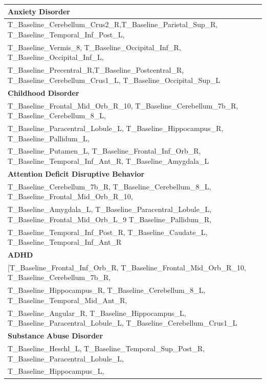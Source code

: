\documentclass[9pt]{article}
\begin{document}
\begin{table}[h!]
	\centering
	\begin{small}
	\begin{tabular}{|l|} 
		\hline
\textbf{ Anxiety Disorder }\\\hline
T\_Baseline\_Cerebellum\_Crus2\_R,T\_Baseline\_Parietal\_Sup\_R, T\_Baseline\_Temporal\_Inf\_Post\_L,\\ T\_Baseline\_Vermis\_8, T\_Baseline\_Occipital\_Inf\_R, T\_Baseline\_Occipital\_Inf\_L,    \\ 
T\_Baseline\_Precentral\_R,T\_Baseline\_Postcentral\_R, T\_Baseline\_Cerebellum\_Crus1\_L, T\_Baseline\_Occipital\_Sup\_L \\ \hline   
 \textbf{Childhood Disorder} \\ \hline
  T\_Baseline\_Frontal\_Mid\_Orb\_R\_10, T\_Baseline\_Cerebellum\_7b\_R,
 T\_Baseline\_Cerebellum\_8\_L,   \\ T\_Baseline\_Paracentral\_Lobule\_L,
  T\_Baseline\_Hippocampus\_R,      T\_Baseline\_Pallidum\_L,      \\    
 T\_Baseline\_Putamen\_L,         T\_Baseline\_Frontal\_Inf\_Orb\_R, 
 T\_Baseline\_Temporal\_Inf\_Ant\_R,   T\_Baseline\_Amygdala\_L \\\hline         
\textbf{ Attention Deficit Disruptive Behavior}\\\hline
 T\_Baseline\_Cerebellum\_7b\_R,    T\_Baseline\_Cerebellum\_8\_L,   
 T\_Baseline\_Frontal\_Mid\_Orb\_R\_10, \\ T\_Baseline\_Amygdala\_L, 
 T\_Baseline\_Paracentral\_Lobule\_L, T\_Baseline\_Frontal\_Mid\_Orb\_L\_9 
 T\_Baseline\_Pallidum\_R, \\        T\_Baseline\_Temporal\_Inf\_Post\_R,
T\_Baseline\_Caudate\_L,     T\_Baseline\_Temporal\_Inf\_Ant\_R \\ \hline
 \textbf{ADHD}\\\hline
 [T\_Baseline\_Frontal\_Inf\_Orb\_R,  T\_Baseline\_Frontal\_Mid\_Orb\_R\_10,
T\_Baseline\_Cerebellum\_7b\_R,\\ T\_Baseline\_Hippocampus\_R, 
 T\_Baseline\_Cerebellum\_8\_L,  T\_Baseline\_Temporal\_Mid\_Ant\_R,\\
 T\_Baseline\_Angular\_R,      T\_Baseline\_Hippocampus\_L,    
 T\_Baseline\_Paracentral\_Lobule\_L, T\_Baseline\_Cerebellum\_Crus1\_L \\ \hline
\textbf{ Substance Abuse Disorder}\\ \hline
T\_Baseline\_Heschl\_L,      T\_Baseline\_Temporal\_Sup\_Post\_R, 
 T\_Baseline\_Paracentral\_Lobule\_L,\\ T\_Baseline\_Hippocampus\_L,       

\end{tabular}
\end{small}
\end{table}
\end{document}
